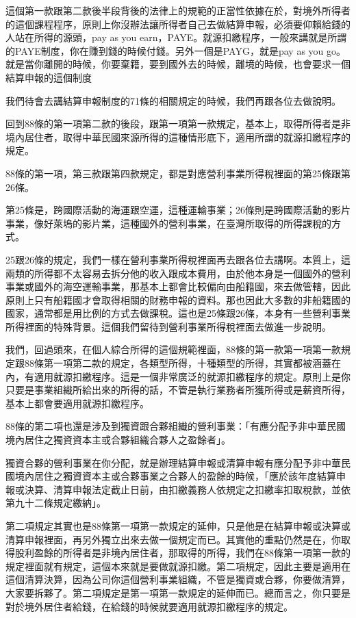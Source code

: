 \documentclass[oneside,sub3section]{ctexbook}
\begin{document}
這個第一款跟第二款後半段背後的法律上的規範的正當性依據在於，對境外所得者的這個課程程序，原則上你沒辦法讓所得者自己去做結算申報，必須要仰賴給錢的人站在所得的源頭，pay as you earn，PAYE。就源扣繳程序，一般來講就是所謂的PAYE制度，你在賺到錢的時候付錢。另外一個是PAYG，就是pay as you go。就是當你離開的時候，你要棄籍，要到國外去的時候，離境的時候，也會要求一個結算申報的這個制度

我們待會去講結算申報制度的71條的相關規定的時候，我們再跟各位去做說明。

回到88條的第一項第二款的後段，跟第一項第一款規定，基本上，取得所得者是非境內居住者，取得中華民國來源所得的這種情形底下，適用所謂的就源扣繳程序的規定。

88條的第一項，第三款跟第四款規定，都是對應營利事業所得稅裡面的第25條跟第26條。

第25條是，跨國際活動的海運跟空運，這種運輸事業；26條則是跨國際活動的影片事業，像好萊塢的影片業，這種國外的營利事業，在臺灣所取得的所得課稅的方式。

25跟26條的規定，我們一樣在營利事業所得稅裡面再去跟各位去講啊。本質上，這兩類的所得都不太容易去拆分他的收入跟成本費用，由於他本身是一個國外的營利事業或國外的海空運輸事業，那基本上都會比較偏向由船籍國，來去做管轄，因此原則上只有船籍國才會取得相關的財務申報的資料。那也因此大多數的非船籍國的國家，通常都是用比例的方式去做課稅。這也是25條跟26條，本身有一些營利事業所得裡面的特殊背景。這個我們留待到營利事業所得稅裡面去做進一步說明。

我們，回過頭來，在個人綜合所得的這個規範裡面，88條的第一款第一項第一款規定跟88條第一項第二款的規定，各類型所得，十種類型的所得，其實都被涵蓋在內，有適用就源扣繳程序。這是一個非常廣泛的就源扣繳程序的規定。原則上是你只要是事業組織所給出來的所得的話，不管是執行業務者所獲所得或是薪資所得，基本上都會要適用就源扣繳程序。

88條的第二項也還是涉及到獨資跟合夥組織的營利事業：「有應分配予非中華民國境內居住之獨資資本主或合夥組織合夥人之盈餘者」。

獨資合夥的營利事業在你分配，就是辦理結算申報或清算申報有應分配予非中華民國境內居住之獨資資本主或合夥事業之合夥人的盈餘的時候，「應於該年度結算申報或決算、清算申報法定截止日前，由扣繳義務人依規定之扣繳率扣取稅款，並依第九十二條規定繳納」。

第二項規定其實也是88條第一項第一款規定的延伸，只是他是在結算申報或決算或清算申報裡面，再另外獨立出來去做一個規定而已。其實他的重點仍然是在，你取得股利盈餘的所得者是非境內居住者，那取得的所得，我們在88條第一項第一款的規定裡面就有規定，這個本來就是要做就源扣繳。第二項規定，因此主要是適用在這個清算決算，因為公司你這個營利事業組織，不管是獨資或合夥，你要做清算，大家要拆夥了。第二項規定是第一項第一款規定的延伸而已。總而言之，你只要是對於境外居住者給錢，在給錢的時候就要適用就源扣繳程序的規定。
\end{document}
